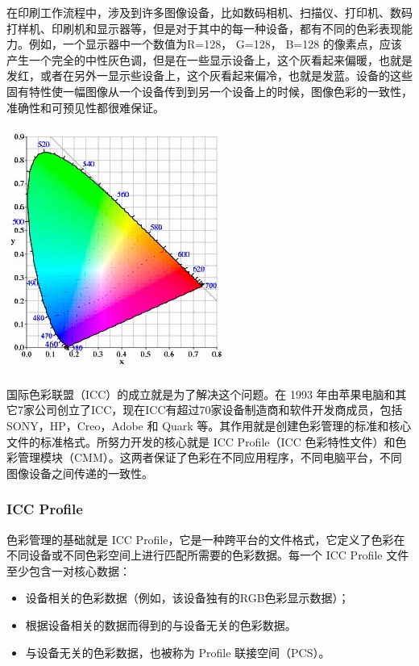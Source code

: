         在印刷工作流程中，涉及到许多图像设备，比如数码相机、扫描仪、打印机、数码打样机、印刷机和显示器等，但是对于其中的每一种设备，都有不同的色彩表现能力。例如，一个显示器中一个数值为R=128， G=128， B=128 的像素点，应该产生一个完全的中性灰色调，但是在一些显示设备上，这个灰看起来偏暖，也就是发红，或者在另外一显示些设备上，这个灰看起来偏冷，也就是发蓝。设备的这些固有特性使一幅图像从一个设备传到到另一个设备上的时候，图像色彩的一致性，准确性和可预见性都很难保证。

    \begin{center}
        \includegraphics[scale=0.7] {icc.jpg}
    \end{center}

        国际色彩联盟（ICC）的成立就是为了解决这个问题。在 1993 年由苹果电脑和其它7家公司创立了ICC，现在ICC有超过70家设备制造商和软件开发商成员，包括 SONY，HP，Creo，Adobe 和 Quark 等。其作用就是创建色彩管理的标准和核心文件的标准格式。所努力开发的核心就是 ICC Profile（ICC 色彩特性文件）和色彩管理模块（CMM）。这两者保证了色彩在不同应用程序，不同电脑平台，不同图像设备之间传递的一致性。

    \subsubsection { ICC Profile}

        色彩管理的基础就是 ICC Profile，它是一种跨平台的文件格式，它定义了色彩在不同设备或不同色彩空间上进行匹配所需要的色彩数据。每一个 ICC Profile 文件至少包含一对核心数据：

        \begin{itemize}
            \item  设备相关的色彩数据（例如，该设备独有的RGB色彩显示数据）；
            \item  根据设备相关的数据而得到的与设备无关的色彩数据。
            \item  与设备无关的色彩数据，也被称为 Profile 联接空间（PCS）。
        \end{itemize}

